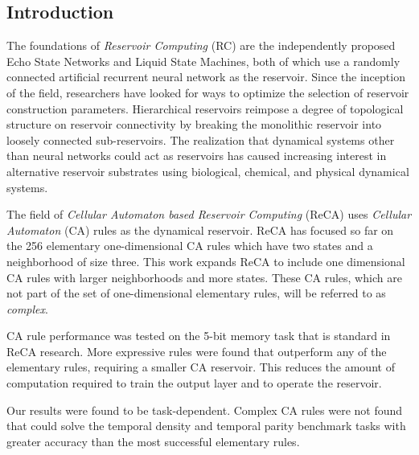 \documentclass{elsarticle}
\begin{document}
\begin{multicols}{2}
	
	\section{Introduction}\label{introduction}
	The foundations of \textit{Reservoir Computing} (RC) are the 
	independently proposed Echo State Networks and Liquid State Machines, both of 
	which use a randomly connected artificial recurrent neural network as the 
	reservoir.  Since the inception of the field,  researchers have looked for ways 
	to optimize the selection of reservoir construction parameters. Hierarchical 
	reservoirs reimpose a degree of topological structure on reservoir connectivity 
	by breaking the monolithic reservoir into loosely connected sub-reservoirs. The 
	realization that dynamical systems other than neural networks could act as 
	reservoirs has caused increasing interest in alternative reservoir substrates 
	using biological, chemical, and physical dynamical systems.  \par
	The field of \textit{Cellular Automaton based Reservoir Computing} (ReCA) uses 
	\textit{Cellular Automaton} (CA) rules as the dynamical reservoir. ReCA has 
	focused so far on the 256 elementary one-dimensional CA rules which have two 
	states and a neighborhood of size three.  This work expands ReCA to include one 
	dimensional CA rules with larger neighborhoods and more states.
	These CA rules, which are not part of the set of one-dimensional elementary 
	rules, will be referred to as \textit{complex}. \par CA rule 
	performance was tested on the 5-bit memory task that is standard in ReCA 
	research. More expressive rules were found that outperform any of the 
	elementary rules, requiring a smaller CA reservoir. This reduces the amount 
	of computation required to train the output layer and to operate the 
	reservoir. \par Our results were found to be task-dependent. Complex CA 
	rules were not found that could solve the temporal density and temporal 
	parity benchmark tasks with greater accuracy than the most successful 
	elementary rules. \par

\end{multicols}
\end{document}
